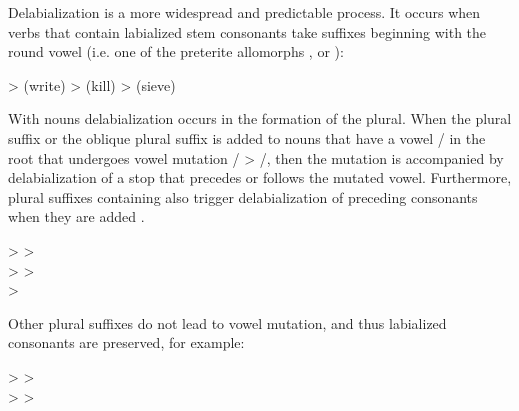 Delabialization is a more widespread and predictable process. It occurs when verbs that contain labialized stem consonants take suffixes beginning with the round vowel  (i.e. one of the preterite allomorphs ,  or ):
%
\begin{exe}
	\ex	\label{ex:delabialization A phon}
	\begin{xlist}
		\ex	{}  >   (write)
		\ex	{}  >   (kill)
		\ex	{}  >   (sieve)
	\end{xlist}
\end{exe}

With nouns delabialization occurs in the formation of the plural. When the plural suffix or the oblique plural suffix is added to nouns that have a vowel \slash{} in the root that undergoes vowel mutation \slash{} > \slash{}, then the mutation is accompanied by delabialization of a stop that precedes or follows the mutated vowel. Furthermore, plural suffixes containing  also trigger delabialization of preceding consonants when they are added .
%
\begin{exe}
	\ex	\label{ex:plural delabialization phon}
\TabPositions{13em}
		  >  \tab 	{}  >  \\
		  > 	\tab 	{}  >  \\
		  > 
\end{exe}

Other plural suffixes do not lead to vowel mutation, and thus labialized consonants are preserved, for example:
%
\begin{exe}
	\ex	\label{ex:no plural vowel mutation phon}
\TabPositions{13em}
		  > 	\tab 	{}  >  \\
		  > 	\tab 	{}  >  
\end{exe}



